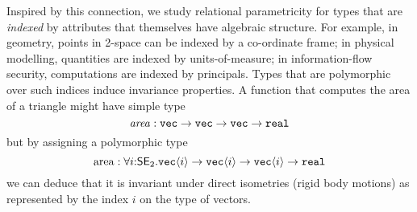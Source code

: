 Inspired by this connection, we study relational parametricity for 
types that are \emph{indexed} by attributes that themselves have algebraic structure.
For example, in geometry, points in 2-space can be indexed by a co-ordinate frame;
in physical modelling, quantities are indexed by units-of-measure;
in information-flow security, computations are indexed by principals. 
Types that are polymorphic over such indices induce invariance properties. 
A function that computes the area of a triangle might have simple type
\[
\mathit{area} : \texttt{vec}\to\texttt{vec}\to\texttt{vec}\to\texttt{real}
\]
but by assigning a polymorphic type
\[
\mathrm{area} : \forall i\mathord:\mathsf{SE}_2.
  \texttt{vec}\langle i \rangle \to \texttt{vec}\langle i \rangle \to \texttt{vec}\langle i \rangle \to \texttt{real} \\
\]
we can deduce that it is invariant under direct isometries (rigid body motions) as 
represented by the index $i$ on the type of vectors.



